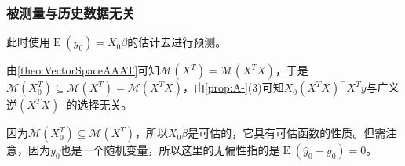 \subsubsection{被测量与历史数据无关}
\begin{derivation}
	此时使用$\operatorname{E}(y_0)=X_0\beta$的估计去进行预测。\par
	由\cref{theo:VectorSpaceAAAT}可知$\mathcal{M}(X^T)=\mathcal{M}(X^TX)$，于是$\mathcal{M}(X_0^T)\subseteq\mathcal{M}(X^T)=\mathcal{M}(X^TX)$，由\cref{prop:A-}(3)可知$X_0(X^TX)^-X^Ty$与广义逆$(X^TX)^-$的选择无关。\par
	因为$\mathcal{M}(X_0^T)\subseteq\mathcal{M}(X^T)$，所以$X_0\beta$是可估的，它具有可估函数的性质。但需注意，因为$y_0$也是一个随机变量，所以这里的无偏性指的是$\operatorname{E}(\hat{y}_0-y_0)=0$。
\end{derivation}
